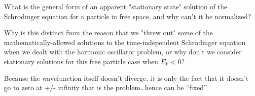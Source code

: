 \documentclass{article}
\begin{document}
What is the general form of an apparent "stationary state" solution of the Schrodinger equation for a particle in free space, and why can't it be normalized?

Why is this distinct from the reason that we "threw out" some of the mathematically-allowed solutions to the time-independent Schrodinger equation when we dealt with the harmonic oscillator problem, or why don't we consider stationary solutions for this free particle case when $E_k < 0$?


Because the wavefunction itself doesn't diverge, it is only the fact that it doesn't go to zero at +/- infinity that is the problem…hence can be “fixed” 
\end{document}
